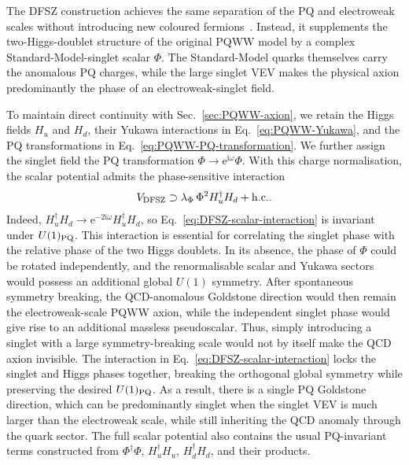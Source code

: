 \documentclass[review]{elsarticle}
\numberwithin{equation}{section}
\numberwithin{table}{section}
\numberwithin{figure}{section}
\def\i{\mathrm{i}}
\def\e{\mathrm{e}}
\def\hc{{\rm h.c.}}
\begin{document}
The DFSZ construction achieves the same separation of the PQ and electroweak scales without introducing new coloured fermions~\cite{Zhitnitsky:1980tq,Dine:1981rt}. Instead, it supplements the two-Higgs-doublet structure of the original PQWW model by a complex Standard-Model-singlet scalar $\Phi$. The Standard-Model quarks themselves carry the anomalous PQ charges, while the large singlet VEV makes the physical axion predominantly the phase of an electroweak-singlet field.


To maintain direct continuity with Sec.~\ref{sec:PQWW-axion}, we retain the Higgs fields $H_u$ and $H_d$, their Yukawa interactions in Eq.~\eqref{eq:PQWW-Yukawa}, and the PQ transformations in Eq.~\eqref{eq:PQWW-PQ-transformation}. We further assign the singlet field the PQ transformation
$\Phi\rightarrow\e^{\i\omega}\Phi$. With this charge normalisation, the scalar potential admits the phase-sensitive interaction
\begin{align}
    V_{\rm DFSZ} \supset \lambda_\Phi\, \Phi^2 H_u^\dagger H_d
    +\hc . 
    \label{eq:DFSZ-scalar-interaction}
\end{align}
Indeed, $H_u^\dagger H_d\rightarrow\e^{-2\i\omega}H_u^\dagger H_d$, so Eq.~\eqref{eq:DFSZ-scalar-interaction} is invariant under $U(1)_{\rm PQ}$. This interaction is essential for correlating the singlet phase with the relative phase of the two Higgs doublets. In its absence, the phase of $\Phi$ could be rotated independently, and the renormalisable scalar and Yukawa sectors would possess an additional global $U(1)$ symmetry. After spontaneous symmetry breaking, the QCD-anomalous Goldstone direction would then remain the electroweak-scale PQWW axion, while the independent singlet phase would give rise to an additional massless pseudoscalar. Thus, simply introducing a singlet with a large symmetry-breaking scale would not by itself make the QCD axion invisible. The interaction in Eq.~\eqref{eq:DFSZ-scalar-interaction} locks the singlet and Higgs phases together, breaking the orthogonal global symmetry while preserving the desired $U(1)_{\rm PQ}$. As a result, there is a single PQ Goldstone direction, which can be predominantly singlet when the singlet VEV is much larger than the electroweak scale, while still inheriting the QCD anomaly through the quark sector. The full scalar potential also contains the usual PQ-invariant terms constructed from $\Phi^\dagger\Phi$, $H_u^\dagger H_u$, $H_d^\dagger H_d$, and their products.
\end{document}
